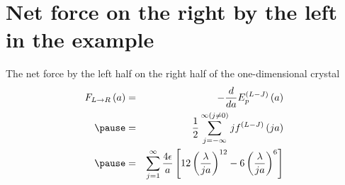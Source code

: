 \documentclass[8pt]{beamer}
\newcommand{\pauseditem}{\pause}
\begin{document}
\section{Net force on the right by the left in the example}

\begin{frame}
{The net force by the left half on the right half of the one-dimensional crystal}
\vspace{-1.2cm}
    \begin{eqnarray}
           F_{L\rightarrow R} \left( a \right) 
           &=&  - \frac{d}{da} E_p^{(L-J)} \left( a \right) \\
           \pauseditem &=& \frac 12 \sum_{ j=-\infty} ^{\infty (j \neq 0)} 
                           j f^{(L-J)} \left(  j a \right) \\
           \pauseditem &=& \sum_{ j=1} ^\infty \frac{4 \epsilon}{a}  
                           \left [ { 12 \left ( \frac{\lambda} 
                           { j a} \right ) }^{12} - 
                           { 6 \left ( \frac{\lambda} { j a} \right ) }^{6} 
                           \right ] 
    \end{eqnarray}
\end{frame}
\end{document}
